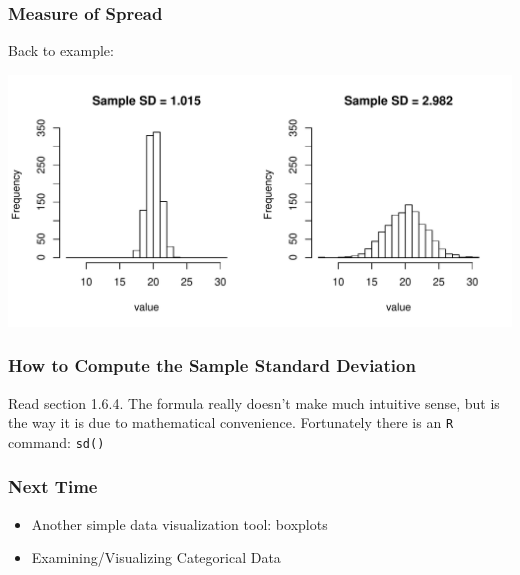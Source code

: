 \documentclass[handout]{beamer}
\newcommand{\blue}[1]{\textcolor{blue2}{#1}}
\begin{document}
\begin{frame}[fragile]
\frametitle{Measure of Spread}
Back to example:
\begin{center}
\includegraphics[width=\textwidth]{figure/spread2.pdf}
\end{center}

\end{frame}



\begin{frame}[fragile]
\frametitle{How to Compute the Sample Standard Deviation}

Read section 1.6.4.  The formula really doesn't make much intuitive sense, but is the way it is due to mathematical convenience.  Fortunately there is an {\tt R} command: {\tt sd()}

\end{frame}



\begin{frame}[fragile]
\frametitle{Next Time}

\begin{itemize}
\item Another simple data visualization tool: boxplots
\item Examining/Visualizing \blue{Categorical} Data
\end{itemize}


\end{frame}
\end{document}

